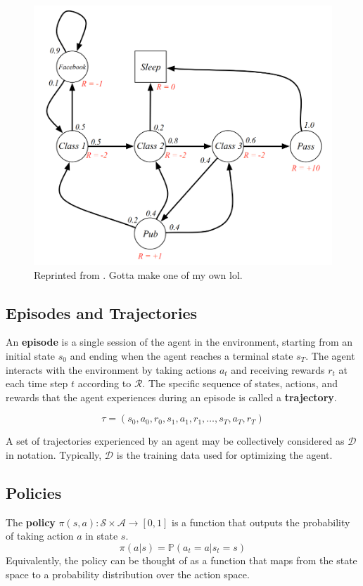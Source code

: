 \documentclass[12pt]{report}
\theoremstyle{definition}
\theoremstyle{remark}
\begin{document}
\begin{figure}[h]
    \centering
    \includegraphics[width=0.7\linewidth]{figs/mdp.png}
    \caption{Reprinted from \cite{silver_lectures_2015}. Gotta make one of my own lol.}
    \label{fig:enter-label}
\end{figure}

\subsection{Episodes and Trajectories}
An \textbf{episode} is a single session of the agent in the environment, starting from an initial state $s_0$ and ending when the agent reaches a terminal state $s_T$. The agent interacts with the environment by taking actions $a_t$ and receiving rewards $r_t$ at each time step $t$ according to $\mathcal{R}$. The specific sequence of states, actions, and rewards that the agent experiences during an episode is called a \textbf{trajectory}.

\begin{equation}
    \tau = (s_0, a_0, r_0, s_1, a_1, r_1, \ldots, s_T, a_T, r_T)
\end{equation}

A set of trajectories experienced by an agent may be collectively considered as $\mathcal{D}$ in notation. Typically, $\mathcal{D}$ is the training data used for optimizing the agent.

\subsection{Policies}

The \textbf{policy} $\pi(s, a): \mathcal{S} \times \mathcal{A} \to [0,1]$ is a function that outputs the probability of taking action $a$ in state $s$.
\begin{equation}
    \pi(a | s) = \mathbb{P}(a_t = a | s_t = s)
\end{equation}
Equivalently, the policy can be thought of as a function that maps from the state space to a probability distribution over the action space.
\end{document}
